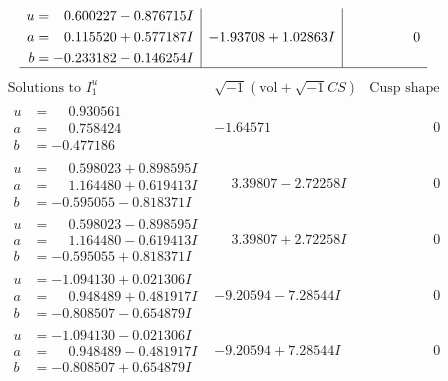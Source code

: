\documentclass[1p]{elsarticle_modified}
\theoremstyle{definition}
\newcommand{\I}{\sqrt{-1}}
\begin{document}
$$\begin{array}{c|c|c}
\begin{aligned}
u &= \phantom{-}0.600227 - 0.876715 I \\
a &= \phantom{-}0.115520 + 0.577187 I \\
b &= -0.233182 - 0.146254 I\end{aligned}
 & -1.93708 + 1.02863 I & \phantom{-0.000000 } 0\\
 \hline 
 \end{array}$$\newpage$$\begin{array}{c|c|c}  
\text{Solutions to }I^u_{1}& \I (\text{vol} + \sqrt{-1}CS) & \text{Cusp shape}\\
 \hline 
\begin{aligned}
u &= \phantom{-}0.930561\phantom{ +0.000000I} \\
a &= \phantom{-}0.758424\phantom{ +0.000000I} \\
b &= -0.477186\phantom{ +0.000000I}\end{aligned}
 & -1.64571\phantom{ +0.000000I} & \phantom{-0.000000 } 0 \\ \hline\begin{aligned}
u &= \phantom{-}0.598023 + 0.898595 I \\
a &= \phantom{-}1.164480 + 0.619413 I \\
b &= -0.595055 - 0.818371 I\end{aligned}
 & \phantom{-}3.39807 - 2.72258 I & \phantom{-0.000000 } 0 \\ \hline\begin{aligned}
u &= \phantom{-}0.598023 - 0.898595 I \\
a &= \phantom{-}1.164480 - 0.619413 I \\
b &= -0.595055 + 0.818371 I\end{aligned}
 & \phantom{-}3.39807 + 2.72258 I & \phantom{-0.000000 } 0 \\ \hline\begin{aligned}
u &= -1.094130 + 0.021306 I \\
a &= \phantom{-}0.948489 + 0.481917 I \\
b &= -0.808507 - 0.654879 I\end{aligned}
 & -9.20594 - 7.28544 I & \phantom{-0.000000 } 0 \\ \hline\begin{aligned}
u &= -1.094130 - 0.021306 I \\
a &= \phantom{-}0.948489 - 0.481917 I \\
b &= -0.808507 + 0.654879 I\end{aligned}
 & -9.20594 + 7.28544 I & \phantom{-0.000000 } 0 \\ \hline\begin{aligned}

\end{aligned}
\end{array}$$
\end{document}
